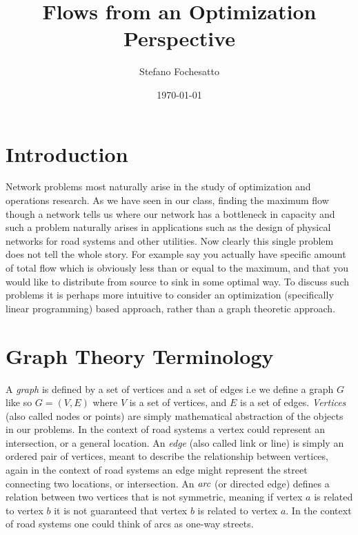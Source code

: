 \documentclass[12pt]{amsart}
\begin{document}
\title{Flows from an Optimization Perspective}

\author{Stefano Fochesatto}

\date{\today}

\maketitle

\section{Introduction}
Network problems most naturally arise in the study of optimization and operations research. As we have seen in our class, finding the maximum flow though a network tells us where our network has a bottleneck in capacity and such a problem naturally arises in applications such as the design of physical networks for road systems and other utilities. Now clearly this single problem does not tell the whole story. For example say you actually have specific amount of total flow which is obviously less than or equal to the maximum, and that you would like to distribute from source to sink in some optimal way. To discuss such problems it is perhaps more intuitive to consider an optimization (specifically linear programming) based approach, rather than a graph theoretic approach.  


\section{Graph Theory Terminology}  
A \emph{graph} is defined by a set of vertices and a set of edges i.e we define a graph $G$ like so $G = (V, E)$
where $V$ is a set of vertices, and $E$ is a set of edges. \emph{Vertices} (also called nodes or points) 
are simply mathematical abstraction of the objects in our problems. In the context of road systems a vertex could represent 
an intersection, or a general location. An \emph{edge} (also called link or line) is simply an ordered pair of vertices, meant to describe the 
relationship between vertices, again in the context of road systems an edge might represent the street connecting two locations, or intersection.
An $\emph{arc}$ (or directed edge) defines a relation between two vertices that is not symmetric, meaning if vertex $a$ is related to vertex $b$
it is not guaranteed that vertex $b$ is related to vertex $a$. In the context of road systems one could think of arcs as one-way streets.
\end{document}
